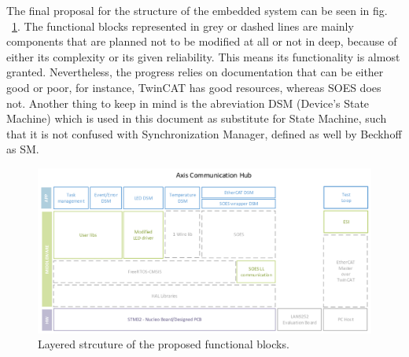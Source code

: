 The final proposal for the structure of the embedded system can be seen in fig. ~\ref{fig:sysStruct}. 
The functional blocks represented in grey or dashed lines are mainly components that are planned not to be modified
at all or not in deep, because of either its complexity or its given reliability. This means its functionality is almost granted. 
Nevertheless, the progress relies on documentation that can be either good or poor, for instance, TwinCAT has good resources, 
whereas SOES does not. 
Another thing to keep in mind is the abreviation DSM (Device's State Machine) which is used in this document as substitute for State Machine,
such that it is not confused with Synchronization Manager, defined as well by Beckhoff as SM.
\begin{figure}[ht]
    \centering
    \includegraphics[width=\textwidth]{imgs/prop-system_struct_v2.png}
    \caption{Layered strcuture of the proposed functional blocks.}
    \label{fig:sysStruct}
\end{figure}



